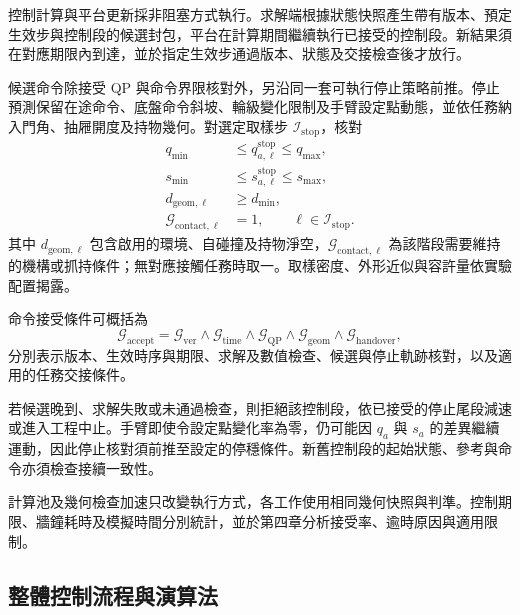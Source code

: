 控制計算與平台更新採非阻塞方式執行。求解端根據狀態快照產生帶有版本、預定生效步與控制段的候選封包，平台在計算期間繼續執行已接受的控制段。新結果須在對應期限內到達，並於指定生效步通過版本、狀態及交接檢查後才放行。

候選命令除接受 QP 與命令界限核對外，另沿同一套可執行停止策略前推。停止預測保留在途命令、底盤命令斜坡、輪級變化限制及手臂設定點動態，並依任務納入門角、抽屜開度及持物幾何。對選定取樣步 $\mathcal I_{\mathrm{stop}}$，核對
\begin{equation}
    \begin{aligned}
        q_{\min}&\leq q_{a,\ell}^{\mathrm{stop}}\leq q_{\max},\\
        s_{\min}&\leq s_{a,\ell}^{\mathrm{stop}}\leq s_{\max},\\
        d_{\mathrm{geom},\ell}&\geq d_{\min},\\
        \mathcal G_{\mathrm{contact},\ell}&=1,
        \qquad \ell\in\mathcal I_{\mathrm{stop}}.
    \end{aligned}
    \label{eq:ch3_stopping_trajectory_checks}
\end{equation}
其中 $d_{\mathrm{geom},\ell}$ 包含啟用的環境、自碰撞及持物淨空，$\mathcal G_{\mathrm{contact},\ell}$ 為該階段需要維持的機構或抓持條件；無對應接觸任務時取一。取樣密度、外形近似與容許量依實驗配置揭露。

命令接受條件可概括為
\begin{equation}
    \mathcal G_{\mathrm{accept}}
    =\mathcal G_{\mathrm{ver}}
     \land\mathcal G_{\mathrm{time}}
     \land\mathcal G_{\mathrm{QP}}
     \land\mathcal G_{\mathrm{geom}}
     \land\mathcal G_{\mathrm{handover}},
    \label{eq:ch3_control_packet_acceptance}
\end{equation}
分別表示版本、生效時序與期限、求解及數值檢查、候選與停止軌跡核對，以及適用的任務交接條件。

若候選晚到、求解失敗或未通過檢查，則拒絕該控制段，依已接受的停止尾段減速或進入工程中止。手臂即使令設定點變化率為零，仍可能因 $q_a$ 與 $s_a$ 的差異繼續運動，因此停止核對須前推至設定的停穩條件。新舊控制段的起始狀態、參考與命令亦須檢查接續一致性。

計算池及幾何檢查加速只改變執行方式，各工作使用相同幾何快照與判準。控制期限、牆鐘耗時及模擬時間分別統計，並於第四章分析接受率、逾時原因與適用限制。


\subsection{整體控制流程與演算法}
\label{subsec:overall_control_algorithm}

